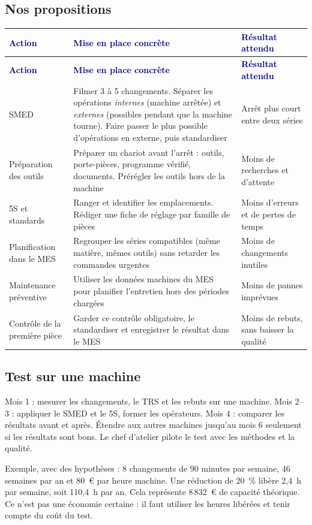 \documentclass[11pt,a4paper]{article}
\newcommand{\thd}[1]{\textbf{\textcolor{navy}{#1}}}
\begin{document}
\subsection*{Nos propositions}
\begin{xltabular}{\linewidth}{@{}P{30mm}YP{40mm}@{}}\toprule
\thd{Action} & \thd{Mise en place concrète} & \thd{Résultat attendu}\\\midrule\endfirsthead
\toprule \thd{Action} & \thd{Mise en place concrète} & \thd{Résultat attendu}\\\midrule\endhead
\bottomrule\endfoot
SMED & Filmer 3 à 5 changements. Séparer les opérations \emph{internes} (machine arrêtée) et \emph{externes} (possibles pendant que la machine tourne). Faire passer le plus possible d'opérations en externe, puis standardiser & Arrêt plus court entre deux séries\\
Préparation des outils & Préparer un chariot avant l'arrêt : outils, porte-pièces, programme vérifié, documents. Prérégler les outils hors de la machine & Moins de recherches et d'attente\\
5S et standards & Ranger et identifier les emplacements. Rédiger une fiche de réglage par famille de pièces & Moins d'erreurs et de pertes de temps\\
Planification dans le MES & Regrouper les séries compatibles (même matière, mêmes outils) sans retarder les commandes urgentes & Moins de changements inutiles\\
Maintenance préventive & Utiliser les données machines du MES pour planifier l'entretien hors des périodes chargées & Moins de pannes imprévues\\
Contrôle de la première pièce & Garder ce contrôle obligatoire, le standardiser et enregistrer le résultat dans le MES & Moins de rebuts, sans baisser la qualité\\
\end{xltabular}

\subsection*{Test sur une machine}
Mois 1 : mesurer les changements, le TRS et les rebuts sur une machine. Mois 2--3 : appliquer le SMED et le 5S, former les opérateurs. Mois 4 : comparer les résultats avant et après. Étendre aux autres machines jusqu'au mois 6 seulement si les résultats sont bons. Le chef d'atelier pilote le test avec les méthodes et la qualité.

Exemple, avec des hypothèses : 8 changements de 90 minutes par semaine, 46 semaines par an et 80~€ par heure machine. Une réduction de 20~\% libère 2,4~h par semaine, soit 110,4~h par an. Cela représente 8\,832~€ de capacité théorique. Ce n'est pas une économie certaine : il faut utiliser les heures libérées et tenir compte du coût du test.
\end{document}
